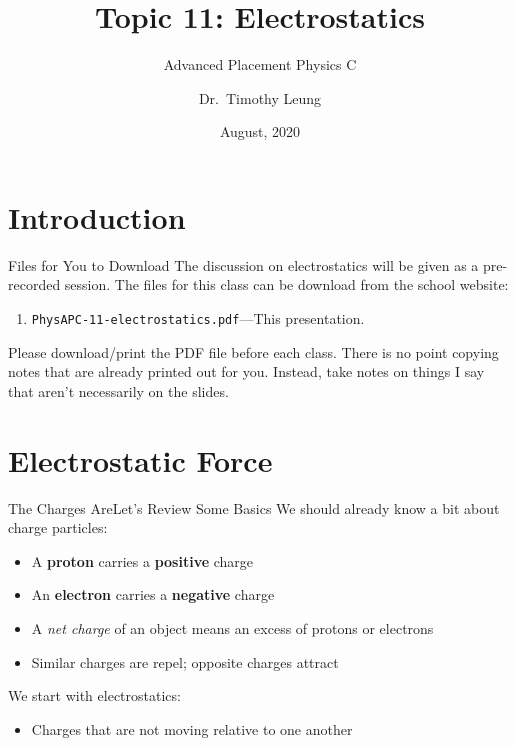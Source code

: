 \documentclass[12pt,aspectratio=169]{beamer}
\title{Topic 11: Electrostatics}
\subtitle{Advanced Placement Physics C}
\author[TML]{Dr.\ Timothy Leung}
\institute{Olympiads School\\Toronto, ON, Canada}
\date{August, 2020}
\begin{document}
\begin{frame}
  \maketitle
\end{frame}


\section[Intro]{Introduction}

\begin{frame}{Files for You to Download}
  The discussion on electrostatics will be given as a pre-recorded session.
  The files for this class can be download from the school website:
  \begin{enumerate}
  \item\texttt{PhysAPC-11-electrostatics.pdf}---This presentation.
  \end{enumerate}
  Please download/print the PDF file before each class. There is no point
  copying notes that are already printed out for you. Instead, take notes on
  things I say that aren't necessarily on the slides.
\end{frame}


\section{Electrostatic Force}

\begin{frame}{The Charges Are}{Let's Review Some Basics}
  We should already know a bit about charge particles:
  \begin{itemize}
  \item A \textbf{proton} carries a \textbf{positive} charge
  \item An \textbf{electron} carries a \textbf{negative} charge
  \item A \emph{net charge} of an object means an excess of protons or electrons
  \item Similar charges are repel; opposite charges attract
  \end{itemize}

  \vspace{.2in}We start with electrostatics:
  \begin{itemize}
  \item Charges that are not moving relative to one another
  \end{itemize}
\end{frame}
\end{document}
